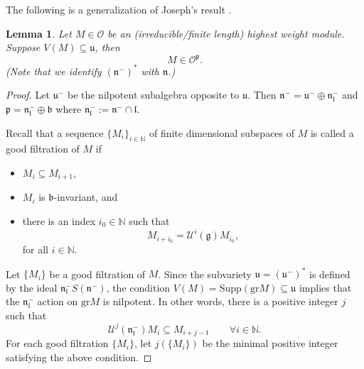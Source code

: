 \documentclass{amsart}[12pt]
\newtheorem{Lem}{Lemma}[section]
\def\fbb{\mathfrak{b}}
\def\fnn{\mathfrak{n}}
\def\fpp{\mathfrak{p}}
\def\fuu{\mathfrak{u}}
\def\fll{\mathfrak{l}}
\def\fbb{\mathfrak{b}}
\def\fgg{\mathfrak{g}}
\def\cU{\mathcal{U}}
\def\Gr{\mathrm{Gr}}
\def\gr{\mathrm{gr}}
\renewcommand{\subset}{\subseteq}
\numberwithin{equation}{section}
\begin{document}
The following is a generalization of Joseph's result \cite[Lemma 6.1]{Jo84}.
\begin{Lem}\label{ma}
	Let $M\in \mathscr{O}$ be an (irreducible/finite length) highest weight module.
	Suppose $V(M)\subset \fuu$, then
	\[
	M\in \mathscr{O}^{\mathfrak{p}}.
	\]
	(Note that we identify $(\fnn^-)^*$ with $\fnn$.)
\end{Lem}
\begin{proof}
	\def\fnlm{\fnn_\fll^-}
	\def\fnm{\fnn^-}
	\def\Supp{\mathrm{Supp}}
	\def\bN{\mathbb{N}}
	\def\sO{\mathscr{O}}
	Let $\fuu^-$ be the nilpotent subalgebra opposite to $\fuu$. 
	Then $\fnn^- = \fuu^- \oplus \fnn_\fll^-$ and $\fpp = \fnlm \oplus \fbb$ where
	$\fnn_\fll^- := \fnn^- \cap \fll$. 

	Recall that a sequence $\{M_i\}_{i\in \bN}$ %
	of finite dimensional subspaces of $M$ is called a  good filtration of $M$ if  
	\begin{itemize}
	\item  $M_i\subset M_{i+1}$, 
	\item $M_i$ is $\fbb$-invariant, and %
	\item there is an index $i_0\in \bN$ such that 
	\[
	M_{i+i_0} = \cU^i(\fgg)M_{i_0}, %
	\]
		for all $i\in \bN$. 
	\end{itemize}

	Let $\{M_i\}$ be a good filtration of $M$. 
	Since the subvariety $\fuu = (\fuu^-)^*$ is defined
	by the ideal $\fnn_\fll^- S(\fnn^-)$,  
	the condition $V(M) = \Supp (\gr M )  \subset \fuu$
	implies that the $\fnn_\fll^-$ action on $\gr M$ is nilpotent. 
	In other words, there
	is a positive integer $j$ such that 
	\[
		\cU^j(\fnn_\fll^-) M_i \subset M_{i+j-1} \qquad \forall i\in \bN. 
	\] 
	For each good filtration $\{M_i\}$,  
	let $j(\{M_i\})$ be the minimal positive integer satisfying the above condition.


\end{proof}
\end{document}
